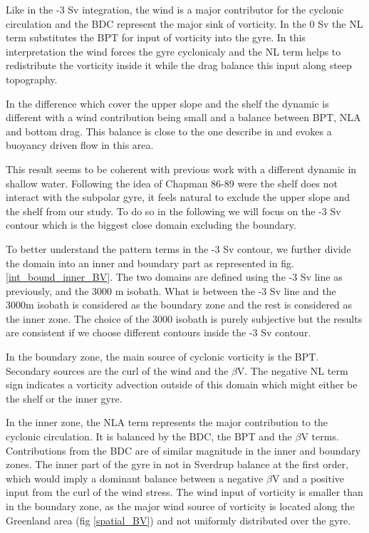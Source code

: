 \documentclass{ametsoc}
\begin{document}
Like in the -3 Sv integration, the wind is a major contributor for the cyclonic circulation and the BDC represent the major sink of vorticity. In the 0 Sv the NL term substitutes the BPT for input of vorticity into the gyre. In this interpretation the wind forces the gyre cyclonicaly and the NL term helps to redistribute the vorticity inside it while the drag balance this input along steep topography. 

In the difference which cover the upper slope and the shelf the dynamic is different with a wind contribution being small and a balance between BPT, NLA and bottom drag. This balance is close to the one describe in \citet{csanady1978} and evokes a buoyancy driven flow in this area. 

This result seems to be coherent with previous work with a different dynamic in shallow water. Following the idea of Chapman 86-89 were the shelf does not interact with the subpolar gyre, it feels natural to exclude the upper slope and the shelf from our study. To do so in the following we will focus on the -3 Sv contour which is the biggest close domain excluding the boundary.
 
To better understand the pattern terms in the -3 Sv contour, we further divide the domain into an inner and boundary part as represented in fig. \ref{int_bound_inner_BV}. The two domains are defined using the -3 Sv line as previously, and the 3000 m isobath. What is between the -3 Sv line and the 3000m isobath is considered as the boundary zone and the rest is considered as the inner zone. The choice of the 3000 isobath is purely subjective but the results are consistent if we choose different contours inside the -3 Sv contour. 

In the boundary zone, the main source of cyclonic vorticity is the BPT. Secondary sources are the curl of the wind and the $\beta$V. The negative NL term sign indicates a vorticity advection outside of this domain which might either be the shelf or the inner gyre.


In the inner zone, the NLA term represents the major contribution to the cyclonic circulation. It is balanced by the BDC, the BPT and the $\beta$V terms. Contributions from the BDC are of similar magnitude in the inner and boundary zones. The inner part of the gyre in not in Sverdrup balance at the first order, which would imply a dominant balance between a negative $\beta$V and a positive input from the curl of the wind stress. The wind input of vorticity is smaller than in the boundary zone, as the major wind source of vorticity is located along the Greenland area (fig \ref{spatial_BV}) and not uniformly distributed over the gyre.
\end{document}
